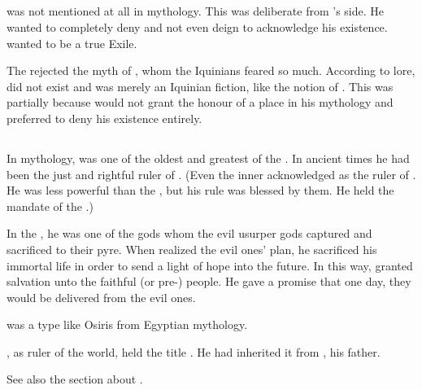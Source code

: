 \subsection{\Ishnaruchaefir}
\Ishnaruchaefir was not mentioned at all in \Ortaican mythology.
This was deliberate from \Secherdamon's side. 
He wanted to completely deny \Ishnaruchaefir and not even deign to acknowledge his existence.
\Secherdamon wanted \Ishnaruchaefir to be a true Exile. 

The \Ortaicans rejected the myth of , whom the Iquinians feared so much.
According to \rethyactic lore, \Isphet did not exist and was merely an Iquinian fiction, like the notion of . 
This was partially because \Secherdamon would not grant \Ishnaruchaefir the honour of a place in his mythology and preferred to deny his existence entirely. 









\subsection{\Mezzagrael}
In \Ortaican mythology, \Mezzagrael was one of the oldest and greatest of the \taorthae. 
In ancient times he had been the just and rightful ruler of \Miith. 
(Even the inner \arcana acknowledged \Mezzagrael as the ruler of \Miith.
 He was less powerful than the \Primordials, but his rule was blessed by them.
 He held the mandate of the \Primordials.)

In the , he was one of the gods whom the evil usurper gods captured and sacrificed to their pyre. 
When \Mezzagrael realized the evil ones' plan, he sacrificed his immortal life in order to send a light of hope into the future. 
In this way, \Mezzagrael granted salvation unto the faithful (\Ortaican or pre-\Ortaican) people.
He gave a promise that one day, they would be delivered from the evil ones. 

\Mezzagrael was a type like Osiris from Egyptian mythology. 

\Mezzagrael, as ruler of the world, held the title \Nechsain. 
He had inherited it from \Settras, his father. 

See also the section about . 





